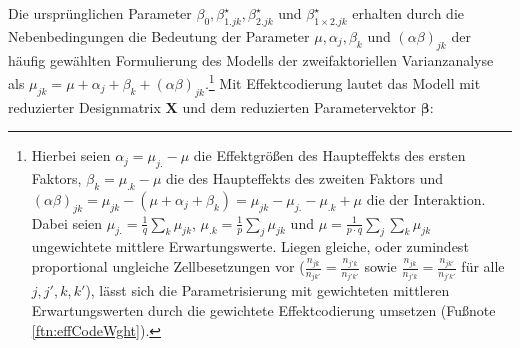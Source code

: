 Die ursprünglichen Parameter $\beta_{0}, \beta_{1.jk}^{\star}, \beta_{2.jk}^{\star}$ und $\beta_{1 \times 2.jk}^{\star}$ erhalten durch die Nebenbedingungen die Bedeutung der Parameter $\mu, \alpha_{j}, \beta_{k}$ und $(\alpha \beta)_{jk}$ der häufig gewählten Formulierung des Modells der zweifaktoriellen Varianzanalyse als $\mu_{jk} = \mu + \alpha_{j} + \beta_{k} + (\alpha \beta)_{jk}$.\footnote{Hierbei seien $\alpha_{j} = \mu_{j.} - \mu$ die Effektgrößen des Haupteffekts des ersten Faktors, $\beta_{k} = \mu_{.k} - \mu$ die des Haupteffekts des zweiten Faktors und $(\alpha \beta)_{jk} = \mu_{jk} - (\mu + \alpha_{j} + \beta_{k}) = \mu_{jk} - \mu_{j.} - \mu_{.k} + \mu$ die der Interaktion. Dabei seien $\mu_{j.} = \frac{1}{q} \sum_{k} \mu_{jk}$, $\mu_{.k} = \frac{1}{p} \sum_{j} \mu_{jk}$ und $\mu = \frac{1}{p \cdot q} \sum_{j} \sum_{k} \mu_{jk}$ ungewichtete mittlere Erwartungswerte. Liegen gleiche, oder zumindest proportional ungleiche Zellbesetzungen vor ($\frac{n_{jk}}{n_{jk'}} = \frac{n_{j'k}}{n_{j'k'}}$ sowie $\frac{n_{jk}}{n_{j'k}} = \frac{n_{jk'}}{n_{j'k'}}$ für alle $j, j', k, k'$), lässt sich die Parametrisierung mit gewichteten mittleren Erwartungswerten durch die gewichtete Effektcodierung umsetzen (Fußnote \ref{ftn:effCodeWght}).} Mit Effektcodierung lautet das Modell mit reduzierter Designmatrix $\bm{X}$ und dem reduzierten Parametervektor $\bm{\beta}$:
